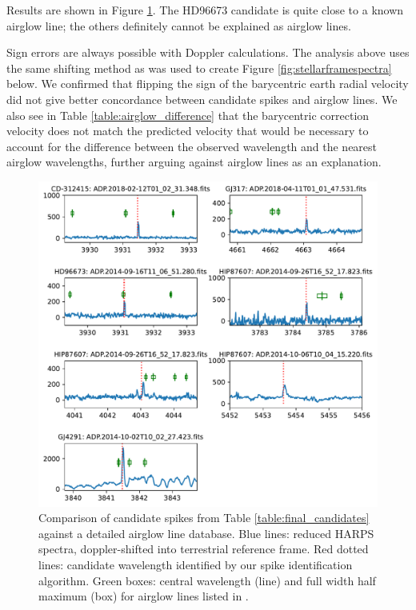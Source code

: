 \documentclass[linenumbers]{aastex631}
\begin{document}
Results are shown in Figure \ref{fig:airglow_reanalysis}. The HD96673 candidate is quite close to a known airglow line; the others definitely cannot be explained as airglow lines.

Sign errors are always possible with Doppler calculations.  The analysis above uses the same shifting method as was used to create Figure \ref{fig:stellarframespectra} below.  We confirmed that flipping the sign of the barycentric earth radial velocity did not give better concordance between candidate spikes and airglow lines. We also see in Table \ref{table:airglow_difference} that the barycentric correction velocity does not match the predicted velocity that would be necessary to account for the difference between the observed wavelength and the nearest airglow wavelengths, further arguing against airglow lines as an explanation.

\begin{figure}
    \centering  \includegraphics[width=\textwidth]{airglow_reanalysis.pdf}
    \caption{Comparison of candidate spikes from Table \ref{table:final_candidates} against a detailed airglow line database.  Blue lines: reduced HARPS spectra, doppler-shifted into terrestrial reference frame.  Red dotted lines: candidate wavelength identified by our spike identification algorithm. Green boxes: central wavelength (line) and full width half maximum (box) for airglow lines listed in  \cite{faint_airglow_database}.}
    \label{fig:airglow_reanalysis}
\end{figure}
\end{document}
